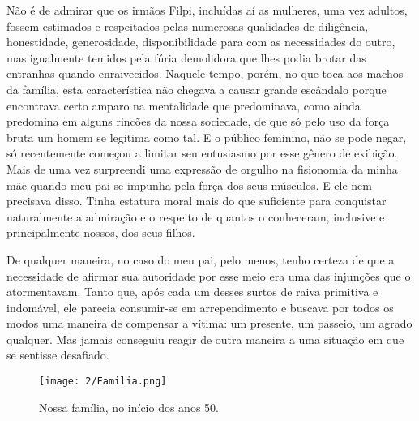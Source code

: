 Não é de admirar que os irmãos Filpi, incluídas aí as mulheres, uma vez adultos, fossem estimados e respeitados pelas numerosas qualidades de diligência, honestidade, generosidade, disponibilidade para com as necessidades do outro, mas igualmente temidos pela fúria demolidora que lhes podia brotar das entranhas quando enraivecidos.  
Naquele tempo, porém, no que toca aos machos da família, esta característica não chegava a causar grande escândalo porque encontrava certo amparo na mentalidade que predominava, como ainda predomina em alguns rincões da nossa sociedade, de que só pelo uso da força bruta um homem se legitima como tal. 
E o público feminino, não se pode negar, só recentemente começou a limitar seu entusiasmo por esse gênero de exibição. 
Mais de uma vez surpreendi uma expressão de orgulho na fisionomia da minha mãe quando meu pai se impunha pela força dos seus músculos. 
E ele nem precisava disso. 
Tinha estatura moral mais do que suficiente para conquistar naturalmente a admiração e o respeito de quantos o conheceram, inclusive e principalmente nossos, dos seus filhos. 

De qualquer maneira, no caso do meu pai, pelo menos, tenho certeza de que a necessidade de afirmar sua autoridade por esse meio era uma das injunções que o atormentavam. 
Tanto que, após cada um desses surtos de raiva primitiva e indomável, ele parecia consumir-se em arrependimento e buscava por todos os modos uma maneira de compensar a vítima: um presente, um passeio, um agrado qualquer. 
Mas jamais conseguiu reagir de outra maneira a uma situação em que se sentisse desafiado.

\begin{figure}[H]
\centering
\texttt{[image: 2/Familia.png]}
\caption{Nossa família, no início dos anos 50.}
\end{figure}

